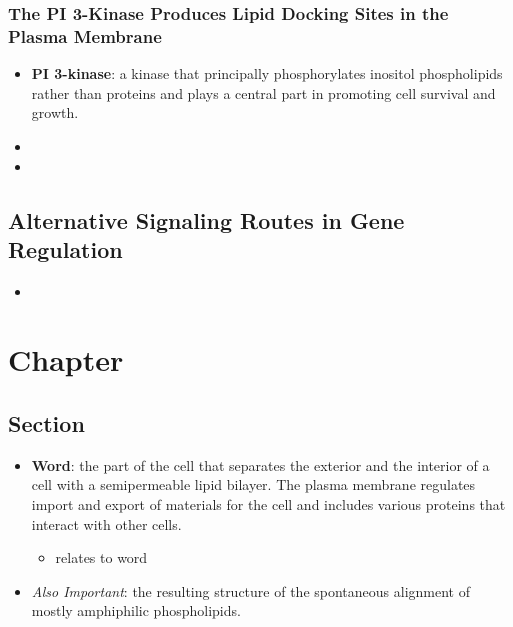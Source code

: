 \documentclass[12pt,a4paper]{article}
\begin{document}
\subsubsection{The PI 3-Kinase Produces Lipid Docking Sites in the Plasma Membrane}
\begin{itemize}
    \item \textbf{PI 3-kinase}: a kinase that principally phosphorylates inositol phospholipids rather than proteins and plays a central part in promoting cell survival and growth.
    \item 
    \item 
\end{itemize}
\subsection{Alternative Signaling Routes in Gene Regulation}
\begin{itemize}
    \item 
\end{itemize}

\clearpage
\section{Chapter}
\subsection{Section}
\begin{itemize}
    \item \textbf{Word}: the part of the cell that separates the exterior and the interior of a cell with a semipermeable lipid bilayer. The plasma membrane regulates import and export of materials for the cell and includes various proteins that interact with other cells. 
    \begin{itemize}
        \item relates to word
    \end{itemize}
    \item \textit{Also Important}: the resulting structure of the spontaneous alignment of mostly amphiphilic phospholipids. 
\end{itemize}
\end{document}
